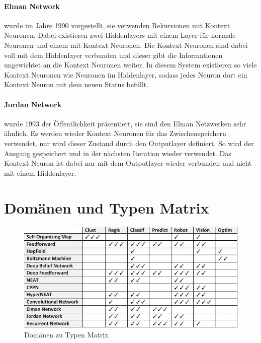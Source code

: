 \paragraph{Elman Network} wurde im Jahre 1990 vorgestellt, sie verwenden Rekursionen mit Kontext Neuronen. 
Dabei existieren zwei Hiddenlayers mit einem Layer für normale Neuronen und einem mit Kontext Neuronen. 
Die Kontext Neuronen sind dabei voll mit dem Hiddenlayer verbunden und dieser gibt die Informationen ungewichtet an die Kontext Neuronen weiter.
In diesem System existieren so viele Kontext Neuronen wie Neuronen im Hiddenlayer, sodass jedes Neuron dort ein Kontext Neuron mit dem neuen Status befüllt.

\paragraph{Jordan Network} wurde 1993 der Öffentlichkeit präsentiert, sie sind den Elman Netzwerken sehr ähnlich. 
Es werden wieder Kontext Neuronen für das Zwischenspeichern verwendet, nur wird dieser Zustand durch den Outputlayer definiert.
So wird der Ausgang gespeichert und in der nächsten Iteration wieder verwendet.
Das Kontext Neuron ist dabei nur mit dem Outputlayer wieder verbunden und nicht mit einem Hiddenlayer.

\section{Domänen und Typen Matrix}

\begin{figure}
	\includegraphics[scale=0.68]{images/typen_domains.png}
	\caption{Domänen zu Typen Matrix \cite{AI3}}
	\label{fig:DomainMatrix}
\end{figure}

